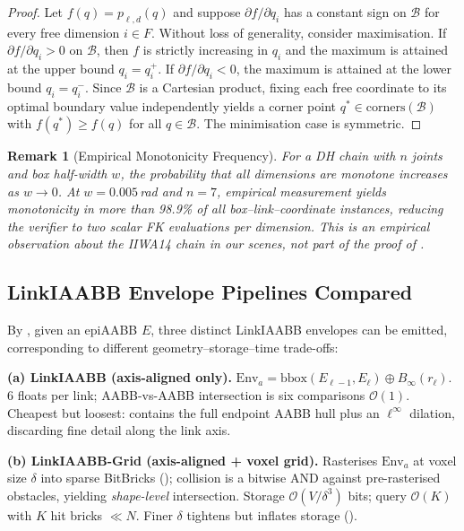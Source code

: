 \documentclass[journal]{IEEEtran}
\newtheorem{remark}{Remark}
\begin{document}
\begin{proof}
Let $f(q) = p_{\ell,d}(q)$ and suppose $\partial f / \partial q_i$ has a
constant sign on $\mathcal{B}$ for every free dimension $i \in F$.
Without loss of generality, consider maximisation. If
$\partial f / \partial q_i > 0$ on $\mathcal{B}$, then $f$ is strictly
increasing in $q_i$ and the maximum is attained at the upper bound
$q_i = q_i^+$. If $\partial f / \partial q_i < 0$, the maximum is
attained at the lower bound $q_i = q_i^-$. Since $\mathcal{B}$ is a
Cartesian product, fixing each free coordinate to its optimal boundary
value independently yields a corner point
$q^* \in \mathrm{corners}(\mathcal{B})$ with
$f(q^*) \geq f(q)$ for all $q \in \mathcal{B}$. The minimisation case is
symmetric.
\end{proof}

\begin{remark}[Empirical Monotonicity Frequency]\label{rem:mono_freq}
For a DH chain with $n$ joints and box half-width $w$, the probability
that all dimensions are monotone increases as $w \to 0$. At
$w = 0.005\,$rad and $n = 7$, empirical measurement yields monotonicity
in more than 98.9\% of all box--link--coordinate instances, reducing
the verifier to two scalar FK evaluations per dimension. This is an
empirical observation about the IIWA14 chain in our scenes, not part
of the proof of .
\end{remark}

\subsection{LinkIAABB Envelope Pipelines Compared}\label{sec:envelope_compare}

By , given an epiAABB $E$, three distinct
LinkIAABB envelopes can be emitted, corresponding to different
geometry--storage--time trade-offs:

\textbf{(a) LinkIAABB (axis-aligned only).}
$\mathrm{Env}_a = \mathrm{bbox}(E_{\ell-1},E_\ell) \oplus B_\infty(r_\ell)$.
6 floats per link; AABB-vs-AABB intersection is six comparisons
$\mathcal{O}(1)$. Cheapest but loosest: contains the full endpoint AABB
hull plus an $\ell^\infty$ dilation, discarding fine detail along the
link axis.

\textbf{(b) LinkIAABB-Grid (axis-aligned + voxel grid).}
Rasterises $\mathrm{Env}_a$ at voxel size $\delta$ into sparse BitBricks
(); collision is a bitwise AND against pre-rasterised
obstacles, yielding \emph{shape-level} intersection. Storage
$\mathcal{O}(V/\delta^3)$ bits; query $\mathcal{O}(K)$ with $K$ hit
bricks $\ll N$. Finer $\delta$ tightens but inflates storage
().
\end{document}
